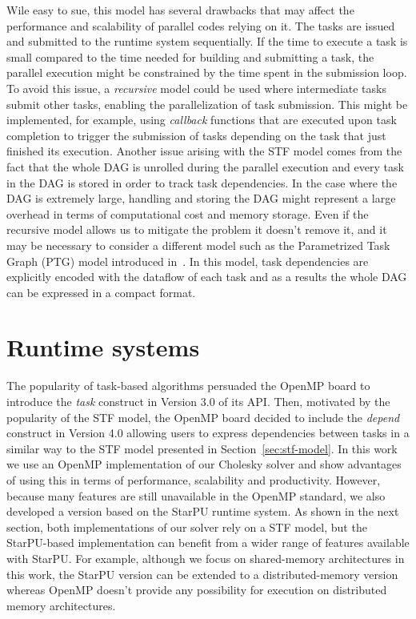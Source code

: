 \documentclass{article}
\newcommand{\lsection}[1]{\section{#1} \setcounter{equation}{0} \setcounter{figure}{0} \setcounter{table}{0} \label{#1}}
\begin{document}
Wile easy to sue, this model
has several drawbacks that may affect the performance and scalability
of parallel codes relying on it. The tasks are issued and submitted to
the runtime system sequentially. If the time to execute a task
is small compared to the time needed for building
and submitting a task, the parallel execution might be constrained
by the time spent in the submission loop.
To avoid this issue, a
\textit{recursive} model could be used where intermediate tasks
submit other tasks, enabling the parallelization of task submission.
This might be implemented, for example, using
\textit{callback} functions that are executed upon task completion to
trigger the submission of tasks depending on the task that just
finished its execution. Another issue arising with the STF model comes
from the fact that the whole DAG is unrolled during the parallel
execution and every task in the DAG is stored in order to track task
dependencies. In the case where the DAG is extremely large, handling
and storing the DAG might represent a large overhead in terms of
computational cost and memory storage. Even if the recursive model
allows us to mitigate the problem it doesn't remove it, and it may be
necessary to consider a different model such as the
Parametrized Task Graph (PTG) model introduced in~\cite{c.l:95}. In
this model, task dependencies are explicitly encoded with the dataflow
of each task and as a results the whole DAG can be expressed in a
compact format.


\lsection{Runtime systems}\label{sec:runtime}
\setcounter{equation}{0}
\setcounter{table}{0}
\setcounter{figure}{0}

The popularity of task-based algorithms persuaded the OpenMP board to
introduce the \textit{task} construct in Version 3.0 of its API. Then,
motivated by the popularity of the STF model, the OpenMP board decided
to include the \textit{depend} construct in Version 4.0 allowing users
to express dependencies between tasks in a similar way to the STF
model presented in Section~\ref{sec:stf-model}. In this work we
use an OpenMP implementation of our Cholesky solver and show
advantages of using this in terms of performance, scalability and
productivity. However, because many features are still unavailable in
the OpenMP standard, we also developed a version based on the
StarPU runtime system. As shown in the next section, both
implementations of our solver rely on a STF model, but the
StarPU-based implementation can benefit from a wider range of features
available with StarPU. For example, although we focus on shared-memory
architectures in this work, the StarPU version can be extended to a
distributed-memory version whereas OpenMP doesn't provide any
possibility for execution on distributed memory architectures.
\end{document}
